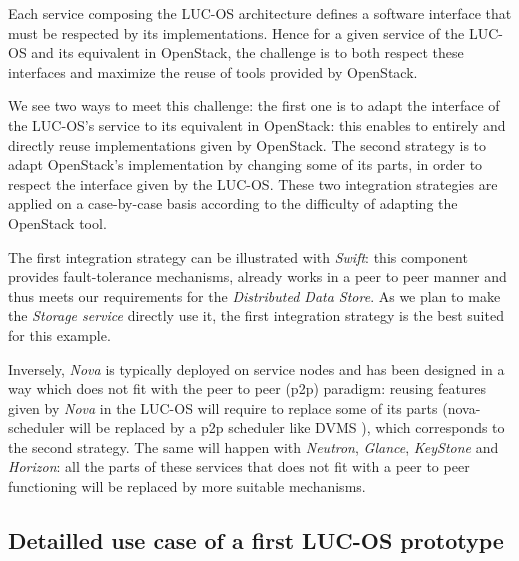 Each service composing the LUC-OS architecture defines a software interface 
that must be respected by its implementations. Hence for a given service of the
LUC-OS and its equivalent in OpenStack, the challenge is to both respect these
interfaces and maximize the reuse of tools provided by OpenStack. 

We see two ways to meet this challenge: the first one is to adapt the interface 
of the LUC-OS's service to its equivalent in OpenStack: this enables to entirely
and directly reuse implementations given by OpenStack. The second strategy is
to adapt OpenStack's implementation by changing some of its parts, in order to 
respect the interface given by the LUC-OS. These two integration strategies are
applied on a case-by-case basis according to the difficulty of adapting the 
OpenStack tool. 

The first integration strategy can be illustrated with \emph{Swift}: this 
component provides fault-tolerance mechanisms, already works in a peer to peer
manner and thus meets our requirements for the \emph{Distributed Data Store}. As
we plan to make the \emph{Storage service} directly use it, the first 
integration strategy is the best suited for this example.

Inversely, \emph{Nova} is typically deployed on service nodes and has been 
designed in a way which does not fit with the peer to peer (p2p) paradigm: 
reusing features given by \emph{Nova} in the LUC-OS will require to replace some
of its parts (nova-scheduler will be replaced by a p2p scheduler like DVMS 
\cite{quesnel:ispa2013}), which corresponds to the second strategy. The same 
will happen with \emph{Neutron}, \emph{Glance}, \emph{KeyStone} and
\emph{Horizon}: all the parts of these services that does not fit with a peer to
peer functioning will be replaced by more suitable mechanisms.

\subsection{Detailled use case of a first LUC-OS prototype}
\label{sub:sec:revisiting_openstack}


